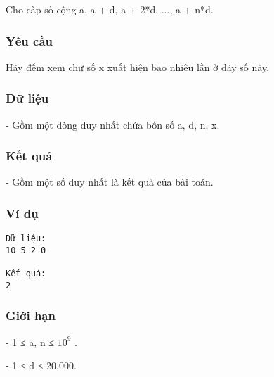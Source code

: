 



   Cho cấp số cộng a, a + d, a + 2*d, ..., a + n*d.  

\subsubsection{   Yêu cầu  }

   Hãy đếm xem chữ số x xuất hiện bao nhiêu lần ở dãy số này.  

\subsubsection{   Dữ liệu  }

   - Gồm một dòng duy nhất chứa bốn số a, d, n, x.  

\subsubsection{   Kết quả  }

   - Gồm một số duy nhất là kết quả của bài toán.  

\subsubsection{   Ví dụ  }
\begin{verbatim}
Dữ liệu:
10 5 2 0

Kết quả:
2
\end{verbatim}

\subsubsection{   Giới hạn  }

   - 1 ≤ a, n ≤ $10^{9}$   .   


   - 1 ≤ d ≤ 20,000.  
